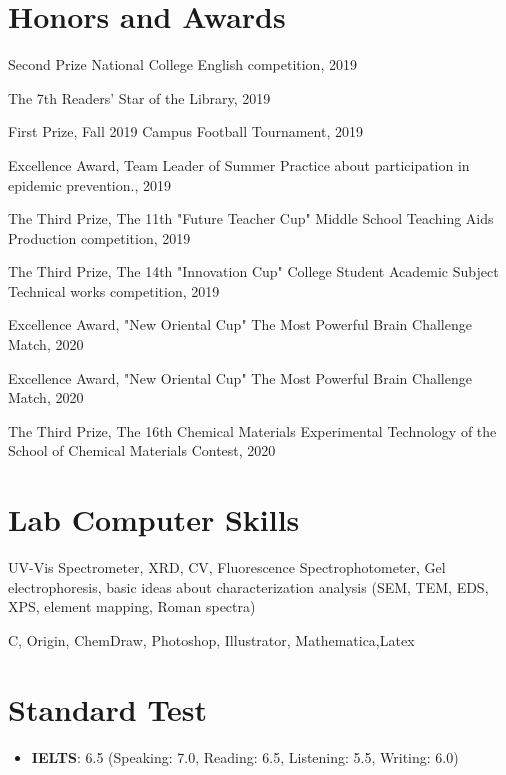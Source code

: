 \documentclass[a4paper,20pt]{article}
\newcommand{\resumeItem}[2]{
  \item\small{
    \textbf{#1}{: #2 \vspace{-2pt}}
  }
}
\newcommand{\resumeSubItem}[2]{\resumeItem{#1}{#2}\vspace{-3pt}}
\newcommand{\resumeSubHeadingListStart}{\begin{itemize}[leftmargin=*]}
\newcommand{\resumeSubHeadingListEnd}{\end{itemize}}
\begin{document}
\section{\textbf{Honors and Awards}}
\begin{description}[font=$\bullet$]
\item {Second Prize National College English competition, 2019}
\vspace{-5pt}
\item {The 7th Readers' Star of the Library, 2019}
\vspace{-5pt}
\item {First Prize, Fall 2019 Campus Football Tournament, 2019}
\vspace{-5pt}
\item {Excellence Award, Team Leader of Summer Practice about participation in epidemic prevention., 2019}
\vspace{-5pt}
\item {The Third Prize, The 11th "Future Teacher Cup" Middle School Teaching Aids Production competition, 2019}
\vspace{-5pt}
\item {The Third Prize, The 14th "Innovation Cup" College Student Academic Subject Technical works competition, 2019}
\vspace{-5pt}
\item {Excellence Award, "New Oriental Cup" The Most Powerful Brain Challenge Match, 2020}
\vspace{-5pt}
\item {Excellence Award, "New Oriental Cup" The Most Powerful Brain Challenge Match, 2020}
\vspace{-5pt}
\item {The Third Prize, The 16th Chemical Materials Experimental Technology of the School of Chemical Materials Contest, 2020}
\vspace{-5pt}
\end{description}

\vspace{-5pt}

\section{\textbf{Lab Computer Skills}}
\begin{description}
	\item {UV-Vis Spectrometer, XRD, CV, Fluorescence Spectrophotometer, Gel electrophoresis, basic ideas about characterization analysis (SEM, TEM, EDS, XPS, element mapping, Roman spectra)}
	\vspace{-5pt}
	\item {C, Origin, ChemDraw, Photoshop, Illustrator, Mathematica,Latex}
	\vspace{-5pt}

\end{description}
\vspace{-5pt}

\section{\textbf{Standard Test}}
\resumeSubHeadingListStart
\resumeSubItem{IELTS}{ 6.5 (Speaking: 7.0, Reading: 6.5, Listening: 5.5, Writing: 6.0)}
\resumeSubHeadingListEnd
\vspace{-5pt}
\end{document}
